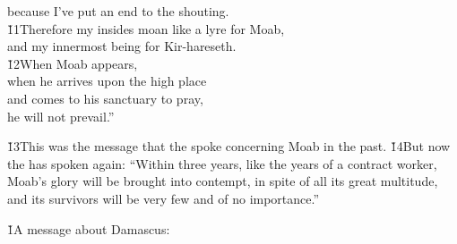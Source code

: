\begin{poetry}
\poemlll       because I've put an end to the shouting. \\
\poeml \v{11}Therefore my insides moan like a lyre for Moab, \\
\poemll    and my innermost being for Kir-hareseth. \\
\poeml \v{12}When Moab appears, \\
\poemll    when he arrives upon the high place \\
\poeml and comes to his sanctuary to pray, \\
\poemll    he will not prevail.''
\end{poetry}

\v{13}This was the message that the  spoke concerning Moab in the past. \v{14}But now the  has spoken again: ``Within three years, like the years of a contract worker, Moab's glory will be brought into contempt, in spite of all its great multitude, and its survivors will be very few and of no importance.''

\v{1}A message about Damascus:

